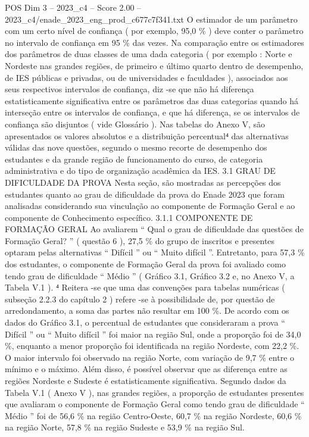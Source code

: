 \begin{textsample}{POS Dim 3 – 2023\_c4 – Score 2.00 – 2023\_c4/enade\_2023\_eng\_prod\_c677c7f341.txt}
O estimador de um parâmetro com um certo nível de confiança ( por exemplo, 95,0 \% ) deve conter o parâmetro no intervalo de confiança em 95 \% das vezes.
Na comparação entre os estimadores dos parâmetros de duas classes de uma dada categoria ( por exemplo : Norte e Nordeste nas grandes regiões, de primeiro e último quarto dentro de desempenho, de IES públicas e privadas, ou de universidades e faculdades ), associados aos seus respectivos intervalos de confiança, diz -se que não há diferença estatisticamente significativa entre os parâmetros das duas categorias quando há interseção entre os intervalos de confiança, e que há diferença, se os intervalos de confiança são disjuntos ( vide Glossário ).
Nas tabelas do Anexo V, são apresentados os valores absolutos e a distribuição percentual⁴ das alternativas válidas das nove questões, segundo o mesmo recorte de desempenho dos estudantes e da grande região de funcionamento do curso, de categoria administrativa e do tipo de organização acadêmica da IES. 3.1 GRAU DE DIFICULDADE DA PROVA Nesta seção, são mostradas as percepções dos estudantes quanto ao grau de dificuldade da prova do Enade 2023 que foram analisadas considerando sua vinculação ao componente de Formação Geral e ao componente de Conhecimento específico. 3.1.1 COMPONENTE DE FORMAÇÃO GERAL Ao avaliarem “ Qual o grau de dificuldade das questões de Formação Geral? ” ( questão 6 ), 27,5 \% do grupo de inscritos e presentes optaram pelas alternativas “ Difícil ” ou “ Muito difícil ”.
Entretanto, para 57,3 \% dos estudantes, o componente de Formação Geral da prova foi avaliado como tendo grau de dificuldade “ Médio ” ( Gráfico 3.1, Gráfico 3.2 e, no Anexo V, a Tabela V.1 ). ⁴ Reitera -se que uma das convenções para tabelas numéricas ( subseção 2.2.3 do capítulo 2 ) refere -se à possibilidade de, por questão de arredondamento, a soma das partes não resultar em 100 \%.
De acordo com os dados do Gráfico 3.1, o percentual de estudantes que consideraram a prova “ Difícil ” ou “ Muito difícil ” foi maior na região Sul, onde a proporção foi de 34,0 \%, enquanto a menor proporção foi identificada na região Nordeste, com 22,2 \%.
O maior intervalo foi observado na região Norte, com variação de 9,7 \% entre o mínimo e o máximo.
Além disso, é possível observar que as diferença entre as regiões Nordeste e Sudeste é estatisticamente significativa.
Segundo dados da Tabela V.1 ( Anexo V ), nas grandes regiões, a proporção de estudantes presentes que avaliaram o componente de Formação Geral como tendo grau de dificuldade “ Médio ” foi de 56,6 \% na região Centro-Oeste, 60,7 \% na região Nordeste, 60,6 \% na região Norte, 57,8 \% na região Sudeste e 53,9 \% na região Sul.

\end{textsample}
